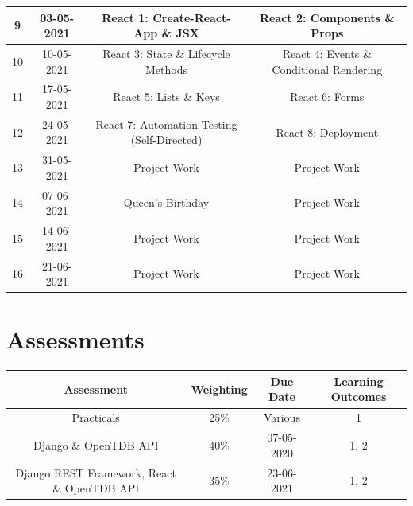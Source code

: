 \documentclass{article}
\begin{document}
\begin{tabular}{|c|c|c|c|}
	\small 9      & 03-05-2021        & \small React 1: Create-React-App \& JSX               & \small React 2: Components \& Props                   \\ \hline
	\small 10     & 10-05-2021        & \small React 3: State \& Lifecycle Methods   & \small React 4: Events \& Conditional Rendering                             \\ \hline
	\small 11     & \small 17-05-2021 & \small React 5:  Lists \& Keys                             & \small  React 6: Forms                          \\ \hline                                           
	\small 12     & \small 24-05-2021 & \small React 7: Automation Testing (Self-Directed)                       & \small React 8:  Deployment                                       \\ \hline
	\small 13     & \small 31-05-2021 & \small Project Work                               & \small Project Work                                         \\ \hline
	\small 14     & \small 07-06-2021 & \cellcolor{yellow} \small Queen's Birthday        & \small Project Work                                         \\ \hline
	\small 15     & \small 14-06-2021 & \small Project Work                               & \small Project Work                                         \\ \hline
	\small 16     & \small 21-06-2021 & \small Project Work                               & \small Project Work                                         \\ \hline
\end{tabular}

\section*{Assessments}
\renewcommand{\arraystretch}{1.5}
\begin{tabular}{|c|c|c|c|}
	\hline
	\textbf{Assessment}                                & \textbf{Weighting} & \textbf{Due Date} & \textbf{Learning Outcomes} \\ \hline 
	\small Practicals                                  & \small 25\%        & \small Various & \small 1                   \\ \hline
	\small Django \& OpenTDB API                       & \small 40\%        & \small 07-05-2020 & \small 1, 2                \\ \hline
	\small Django REST Framework, React \& OpenTDB API & \small 35\%        & \small 23-06-2021 & \small 1, 2                \\ \hline
\end{tabular}
\end{document}
